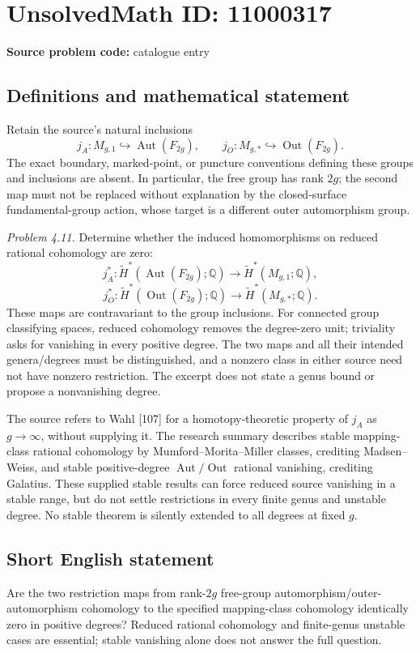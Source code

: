 \documentclass[11pt]{article}
\newcommand{\Q}{\mathbb{Q}}
\begin{document}
\section*{UnsolvedMath ID: 11000317}
\textbf{Source problem code:} catalogue entry
\subsection{Definitions and mathematical statement}
Retain the source's natural inclusions
\[
 j_A:M_{g,1}\hookrightarrow\operatorname{Aut}(F_{2g}),
 \qquad j_O:M_{g,*}\hookrightarrow\operatorname{Out}(F_{2g}).
\]
The exact boundary, marked-point, or puncture conventions defining these groups and inclusions are absent. In particular, the free group has rank \(2g\); the second map must not be replaced without explanation by the closed-surface fundamental-group action, whose target is a different outer automorphism group.

\emph{Problem 4.11.} Determine whether the induced homomorphisms on reduced rational cohomology are zero:
\[
 j_A^*:\widetilde H^*(\operatorname{Aut}(F_{2g});\Q)
       \longrightarrow\widetilde H^*(M_{g,1};\Q),
\]
\[
 j_O^*:\widetilde H^*(\operatorname{Out}(F_{2g});\Q)
       \longrightarrow\widetilde H^*(M_{g,*};\Q).
\]
These maps are contravariant to the group inclusions. For connected group classifying spaces, reduced cohomology removes the degree-zero unit; triviality asks for vanishing in every positive degree. The two maps and all their intended genera/degrees must be distinguished, and a nonzero class in either source need not have nonzero restriction. The excerpt does not state a genus bound or propose a nonvanishing degree.

The source refers to Wahl [107] for a homotopy-theoretic property of \(j_A\) as \(g\to\infty\), without supplying it. The research summary describes stable mapping-class rational cohomology by Mumford--Morita--Miller classes, crediting Madsen--Weiss, and stable positive-degree \(\operatorname{Aut}/\operatorname{Out}\) rational vanishing, crediting Galatius. These supplied stable results can force reduced source vanishing in a stable range, but do not settle restrictions in every finite genus and unstable degree. No stable theorem is silently extended to all degrees at fixed \(g\).
\subsection{Short English statement}
Are the two restriction maps from rank-\(2g\) free-group automorphism/outer-automorphism cohomology to the specified mapping-class cohomology identically zero in positive degrees? Reduced rational cohomology and finite-genus unstable cases are essential; stable vanishing alone does not answer the full question.
\end{document}
